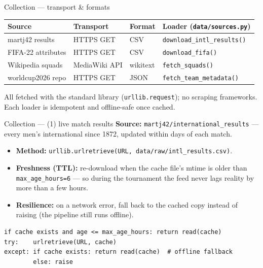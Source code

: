 \documentclass[aspectratio=169]{beamer}
\begin{document}
\begin{frame}{Collection --- transport \& formats}
\centering
\begin{tabular}{@{}llll@{}}
\toprule
Source & Transport & Format & Loader (\texttt{data/sources.py}) \\
\midrule
martj42 results   & HTTPS GET & CSV       & \texttt{download\_intl\_results()} \\
FIFA-22 attributes& HTTPS GET & CSV       & \texttt{download\_fifa()} \\
Wikipedia squads  & MediaWiki API & wikitext & \texttt{fetch\_squads()} \\
worldcup2026 repo & HTTPS GET & JSON      & \texttt{fetch\_team\_metadata()} \\
\bottomrule
\end{tabular}
\vspace{1em}
\footnotesize All fetched with the standard library (\texttt{urllib.request});
no scraping frameworks. Each loader is idempotent and offline-safe once cached.
\end{frame}

\begin{frame}[fragile]{Collection --- (1) live match results}
\textbf{Source:} \texttt{martj42/international\_results} --- every men's
international since 1872, updated within days of each match.
\begin{itemize}\footnotesize
  \item \textbf{Method:} \texttt{urllib.urlretrieve(URL, data/raw/intl\_results.csv)}.
  \item \textbf{Freshness (TTL):} re-download when the cache file's mtime is
        older than \texttt{max\_age\_hours=6} --- so during the tournament the
        feed never lags reality by more than a few hours.
  \item \textbf{Resilience:} on a network error, fall back to the cached copy
        instead of raising (the pipeline still runs offline).
\end{itemize}
\begin{lstlisting}
if cache exists and age <= max_age_hours: return read(cache)
try:    urlretrieve(URL, cache)
except: if cache exists: return read(cache)  # offline fallback
        else: raise
\end{lstlisting}
\end{frame}
\end{document}
